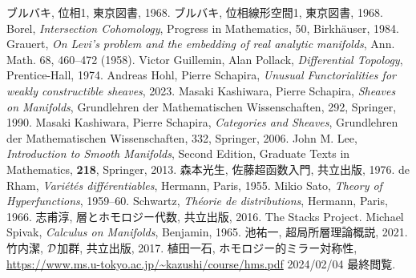 \begin{thebibliography}{20} 
     ブルバキ, 位相1, 東京図書, 1968.
     ブルバキ, 位相線形空間1, 東京図書, 1968.
     Borel, 
    \textit{Intersection Cohomology}, 
    Progress in Mathematics, 50, Birkh\"auser, 1984.
 Grauert, 
    \textit{On Levi's problem and the embedding of real analytic manifolds}, 
    Ann. Math. 68, 460--472 (1958).
 Victor Guillemin, Alan Pollack, 
    \textit{Differential Topology}, 
    Prentice-Hall, 1974.
     Andreas Hohl, Pierre Schapira, 
    \textit{Unusual Functorialities for weakly constructible sheaves}, 
    2023.
     Masaki Kashiwara, Pierre Schapira, 
    \textit{Sheaves on Manifolds}, 
    Grundlehren der Mathematischen Wissenschaften, 292, Springer, 1990.
 Masaki Kashiwara, Pierre Schapira, 
    \textit{Categories and Sheaves}, 
    Grundlehren der Mathematischen Wissenschaften, 332, Springer, 2006.
     John M. Lee, 
    \textit{Introduction to Smooth Manifolds}, Second Edition,
    Graduate Texts in Mathematics, \textbf{218}, Springer, 2013.
     森本光生, 佐藤超函数入門, 共立出版, 1976. 
 de Rham, 
    \textit{Vari\'et\'es diff\'erentiables}, 
    Hermann, Paris, 1955.
 Mikio Sato, 
    \textit{Theory of Hyperfunctions}, 
    1959--60.
 Schwartz, 
    \textit{Th\'eorie de distributions}, 
    Hermann, Paris, 1966.
 志甫淳, 層とホモロジー代数, 共立出版, 2016.
 The Stacks Project.
 Michael Spivak, 
\textit{Calculus on Manifolds}, 
Benjamin, 1965.
 池祐一, 超局所層理論概説, 2021.
 竹内潔, \(\mathcal{D}\)加群, 共立出版, 2017.
 植田一石, ホモロジー的ミラー対称性, \url{https://www.ms.u-tokyo.ac.jp/~kazushi/course/hms.pdf} 2024/02/04 最終閲覧.

\end{thebibliography}




